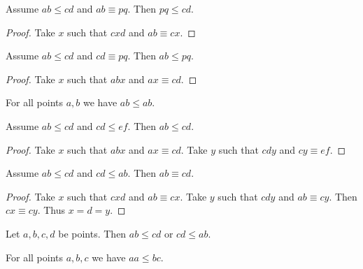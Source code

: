 \documentclass[10pt,a4paper,parskip=half,numbers=endperiod,headings=standardclasses,parskip]{scrartcl}
\newcommand{\Cong}[4]{#1 #2 \equiv #3 #4}
\newcommand{\Betw}[3]{#1 #2 #3}
\newcommand{\Leq}[4]{#1 #2 \leq #3 #4}
\begin{document}
  \begin{forthel}
    \begin{lemma}[LessCongLeft] %
      Assume $\Leq{a}{b}{c}{d}$ and $\Cong{a}{b}{p}{q}$.
      Then $\Leq{p}{q}{c}{d}$.
    \end{lemma}
    \begin{proof}
      Take $x$ such that $\Betw{c}{x}{d}$ and $\Cong{a}{b}{c}{x}$.
    \end{proof}

    \begin{lemma}[LessCongRight] %
      Assume $\Leq{a}{b}{c}{d}$ and $\Cong{c}{d}{p}{q}$.
      Then $\Leq{a}{b}{p}{q}$.
    \end{lemma}
    \begin{proof}
      Take $x$ such that $\Betw{a}{b}{x}$ and $\Cong{a}{x}{c}{d}$.
    \end{proof}

    \begin{lemma}[LessReflexivity] %
      For all points $a, b$ we have $\Leq{a}{b}{a}{b}$.
    \end{lemma}

    \begin{lemma}[LessTransitivity] %
      Assume $\Leq{a}{b}{c}{d}$ and $\Leq{c}{d}{e}{f}$.
      Then $\Leq{a}{b}{c}{d}$.
    \end{lemma}
    \begin{proof}
      Take $x$ such that $\Betw{a}{b}{x}$ and $\Cong{a}{x}{c}{d}$.
      Take $y$ such that $\Betw{c}{d}{y}$ and $\Cong{c}{y}{e}{f}$.
    \end{proof}

    \begin{lemma}[LessClamp] %
      Assume $\Leq{a}{b}{c}{d}$ and $\Leq{c}{d}{a}{b}$.
      Then $\Cong{a}{b}{c}{d}$.
    \end{lemma}
    \begin{proof}
      Take $x$ such that $\Betw{c}{x}{d}$ and $\Cong{a}{b}{c}{x}$.
      Take $y$ such that $\Betw{c}{d}{y}$ and $\Cong{a}{b}{c}{y}$.
      Then $\Cong{c}{x}{c}{y}$. Thus $x = d = y$.
    \end{proof}

    \begin{axiom}[LessConnex] %
      Let $a, b, c, d$ be points.
      Then $\Leq{a}{b}{c}{d}$ or $\Leq{c}{d}{a}{b}$.
    \end{axiom}

    \begin{lemma} %
      For all points $a, b, c$ we have $\Leq{a}{a}{b}{c}$.
    \end{lemma}


\end{forthel}
\end{document}
